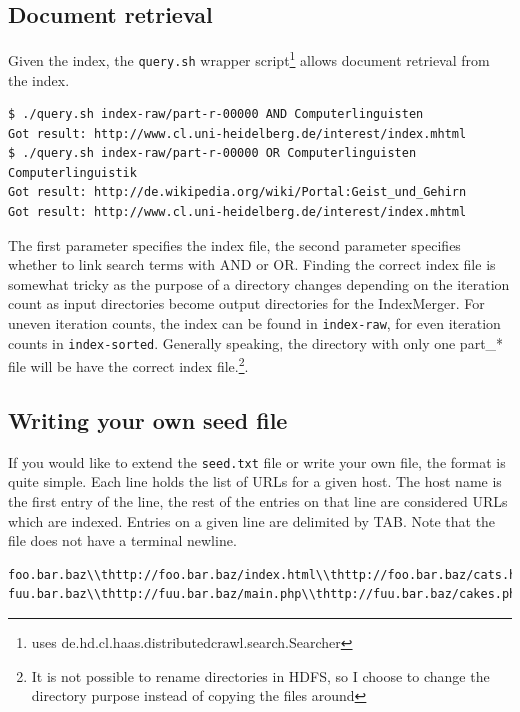 \documentclass[12pt,a4paper]{report}
\begin{document}
\subsection{Document retrieval}
Given the index, the \texttt{query.sh} wrapper script\footnote{uses de.hd.cl.haas.distributedcrawl.search.Searcher} allows document retrieval from the index.
\begin{verbatim}
$ ./query.sh index-raw/part-r-00000 AND Computerlinguisten
Got result: http://www.cl.uni-heidelberg.de/interest/index.mhtml
$ ./query.sh index-raw/part-r-00000 OR Computerlinguisten Computerlinguistik
Got result: http://de.wikipedia.org/wiki/Portal:Geist_und_Gehirn
Got result: http://www.cl.uni-heidelberg.de/interest/index.mhtml
\end{verbatim}
The first parameter specifies the index file, the second parameter specifies whether to link search terms with AND or OR. Finding the correct index file is somewhat tricky as
the purpose of a directory changes depending on the iteration count as input directories become output directories for the IndexMerger. For uneven iteration counts, the index can be found in \texttt{index-raw}, for even iteration counts in \texttt{index-sorted}. Generally speaking, the directory with only one part\_* file will be have the correct index file.\footnote{It is not possible to rename directories in HDFS, so I choose to change the directory purpose instead of copying the files around}.
\subsection{Writing your own seed file}
If you would like to extend the \texttt{seed.txt} file or write your own file, the format is quite simple.
Each line holds the list of URLs for a given host. The host name is the first entry of the line, the rest of the entries
on that line are considered URLs which are indexed. Entries on a given line are delimited by TAB. Note that the file does not have a terminal newline.
\begin{verbatim}
foo.bar.baz\\thttp://foo.bar.baz/index.html\\thttp://foo.bar.baz/cats.html\n
fuu.bar.baz\\thttp://fuu.bar.baz/main.php\\thttp://fuu.bar.baz/cakes.php
\end{verbatim}
\end{document}
